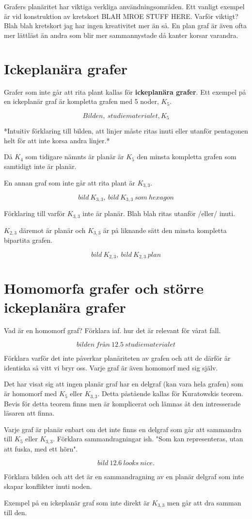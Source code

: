 \documentclass[a4paper,11pt]{article}
\begin{document}
Grafers planäritet har viktiga verkliga användningsområden. Ett vanligt exempel är vid konstruktion av kretskort BLAH MROE STUFF HERE.
Varför viktigt? Blah blah kretskort jag har ingen kreativitet mer än så. En plan graf är även ofta mer lättläst än andra som blir mer sammannystade då kanter korsar varandra.

\section*{Ickeplanära grafer}

Grafer som inte går att rita plant kallas för \textbf{ickeplanära grafer}. Ett exempel på en ickeplanär graf är kompletta grafen med 5 noder, $K_5$.

$$Bilden,\ studiematerialet, K_5$$

*Intuitiv förklaring till bilden, att linjer måste ritas inuti eller utanför pentagonen helt för att inte korsa andra linjer.*

Då $K_4$ som tidigare nämnts är planär är $K_5$ den minsta kompletta grafen som samtidigt inte är planär.

En annan graf som inte går att rita plant är $K_{3,3}$.

$$bild\ K_{3,3},\ bild\ K_{3,3}\ som\ hexagon$$

Förklaring till varför $K_{3,3}$ inte är planär. Blah blah ritas utanför /eller/ inuti.

$K_{2,3}$ däremot är planär och $K_{3,3}$ är på liknande sätt den minsta kompletta bipartita grafen. 

$$bild\ K_{2,3},\ bild\ K_{2,3}\ plan$$

\section*{Homomorfa grafer och större ickeplanära grafer}

Vad är en homomorf graf? Förklara iaf. hur det är relevant för vårat fall.

$$bilden\ från\ 12.5\ studiematerialet$$

Förklara varför det inte påverkar planäriteten av grafen och att de därför är identiska så vitt vi bryr oss. Varje graf är även homomorf med sig själv.

Det har visat sig att ingen planär graf har en delgraf (kan vara hela grafen) som är homomorf med $K_{5}$ eller $K_{3,3}$. Detta påstående kallas för Kuratowskis teorem. Bevis för detta teorem finns men är komplicerat och lämnas åt den intresserade läsaren att finna.

Varje graf är planär enbart om det inte finns en delgraf som går att sammandra till $K_5$ eller $K_{3,3}$. Förklara sammandragningar ish. "Som kan representeras, utan att fuska\texttrademark, med ett hörn".

$$bild\ 12.6\ looks\ nice.$$

Förklara bilden och att det är en sammandragning av en planär delgraf som inte skapar konflikter inuti noden.

Exempel på en ickeplanär graf som inte direkt är $K_{3,3}$ men går att dra samman till den.
\end{document}
